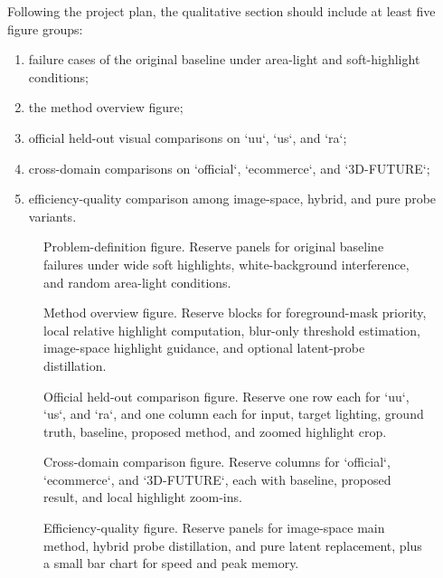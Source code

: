\documentclass[UTF8,a4paper]{ctexart}
\begin{document}
Following the project plan, the qualitative section should include at least five figure groups:

\begin{enumerate}
\item failure cases of the original baseline under area-light and soft-highlight conditions;
\item the method overview figure;
\item official held-out visual comparisons on `uu`, `us`, and `ra`;
\item cross-domain comparisons on `official`, `ecommerce`, and `3D-FUTURE`;
\item efficiency-quality comparison among image-space, hybrid, and pure probe variants.
\end{enumerate}

\begin{figure}[htbp]
\centering
\fbox{\rule{0pt}{4.7cm}\rule{0.92\linewidth}{0pt}}
\caption{Problem-definition figure. Reserve panels for original baseline failures under wide soft highlights, white-background interference, and random area-light conditions.}
\end{figure}

\begin{figure}[htbp]
\centering
\fbox{\rule{0pt}{5.0cm}\rule{0.92\linewidth}{0pt}}
\caption{Method overview figure. Reserve blocks for foreground-mask priority, local relative highlight computation, blur-only threshold estimation, image-space highlight guidance, and optional latent-probe distillation.}
\end{figure}

\begin{figure}[htbp]
\centering
\fbox{\rule{0pt}{5.0cm}\rule{0.92\linewidth}{0pt}}
\caption{Official held-out comparison figure. Reserve one row each for `uu`, `us`, and `ra`, and one column each for input, target lighting, ground truth, baseline, proposed method, and zoomed highlight crop.}
\end{figure}

\begin{figure}[htbp]
\centering
\fbox{\rule{0pt}{5.0cm}\rule{0.92\linewidth}{0pt}}
\caption{Cross-domain comparison figure. Reserve columns for `official`, `ecommerce`, and `3D-FUTURE`, each with baseline, proposed result, and local highlight zoom-ins.}
\end{figure}

\begin{figure}[htbp]
\centering
\fbox{\rule{0pt}{4.6cm}\rule{0.92\linewidth}{0pt}}
\caption{Efficiency-quality figure. Reserve panels for image-space main method, hybrid probe distillation, and pure latent replacement, plus a small bar chart for speed and peak memory.}
\end{figure}
\end{document}
